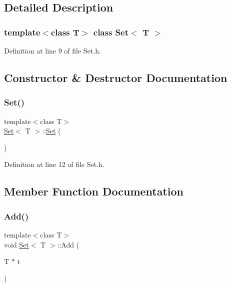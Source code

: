 \subsection{Detailed Description}
\subsubsection*{template$<$class T$>$\newline
class Set$<$ T $>$}



Definition at line 9 of file Set.\+h.



\subsection{Constructor \& Destructor Documentation}
\mbox{\label{class_set_ac57fb2ceddf11dad44bcd9329265580d}} 
\subsubsection{\texorpdfstring{Set()}{Set()}}
{\footnotesize\ttfamily template$<$class T$>$ \\
\hyperlink{class_set}{Set}$<$ T $>$\+::\hyperlink{class_set}{Set} (\begin{DoxyParamCaption}{ }\end{DoxyParamCaption})\hspace{0.3cm}{\ttfamily [inline]}}



Definition at line 12 of file Set.\+h.



\subsection{Member Function Documentation}
\mbox{\label{class_set_afc630403d8cd371e244ff4c425b40edf}} 
\subsubsection{\texorpdfstring{Add()}{Add()}}
{\footnotesize\ttfamily template$<$class T$>$ \\
void \hyperlink{class_set}{Set}$<$ T $>$\+::Add (\begin{DoxyParamCaption}\item[{T $\ast$}]{t }\end{DoxyParamCaption})\hspace{0.3cm}{\ttfamily [inline]}}



